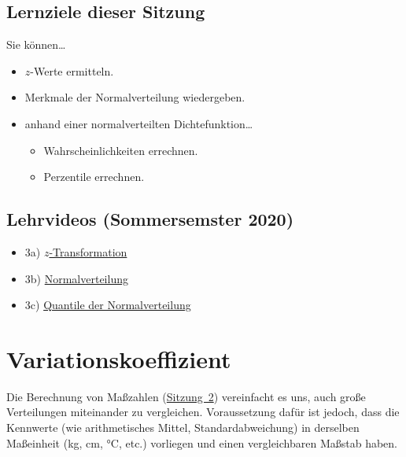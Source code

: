 \documentclass[
  11pt,
  ngerman,
  a4paper,
]{report}
\providecommand{\tightlist}{%
  \setlength{\itemsep}{0pt}\setlength{\parskip}{0pt}}
\begin{document}
\hypertarget{lernziele-dieser-sitzung-2}{%
\subsection*{Lernziele dieser Sitzung}\label{lernziele-dieser-sitzung-2}}

Sie können\ldots{}

\begin{itemize}
\tightlist
\item
  \(z\)-Werte ermitteln.
\item
  Merkmale der Normalverteilung wiedergeben.
\item
  anhand einer normalverteilten Dichtefunktion\ldots{}

  \begin{itemize}
  \tightlist
  \item
    Wahrscheinlichkeiten errechnen.
  \item
    Perzentile errechnen.
  \end{itemize}
\end{itemize}

\hypertarget{lehrvideos-sommersemster-2020}{%
\subsection*{Lehrvideos (Sommersemster 2020)}\label{lehrvideos-sommersemster-2020}}

\begin{itemize}
\tightlist
\item
  3a) \href{https://video01.uni-frankfurt.de/Mediasite/Play/8c755eed883b4ea0924481da818b742f1d}{\(z\)-Transformation}
\item
  3b) \href{https://video01.uni-frankfurt.de/Mediasite/Play/26e839cc0d8d43d2a74c2c03b76aa6421d}{Normalverteilung}
\item
  3c) \href{https://video01.uni-frankfurt.de/Mediasite/Play/902e68deb21045a79473a249303558d11d}{Quantile der Normalverteilung}
\end{itemize}

\hypertarget{variationskoeffizient}{%
\section{Variationskoeffizient}\label{variationskoeffizient}}

Die Berechnung von Maßzahlen (\protect\hyperlink{mauxdfzahlen}{Sitzung~2}) vereinfacht es uns, auch große Verteilungen miteinander zu vergleichen. Voraussetzung dafür ist jedoch, dass die Kennwerte (wie arithmetisches Mittel, Standardabweichung) in derselben Maßeinheit (kg, cm, °C, etc.) vorliegen und einen vergleichbaren Maßstab haben.
\end{document}
